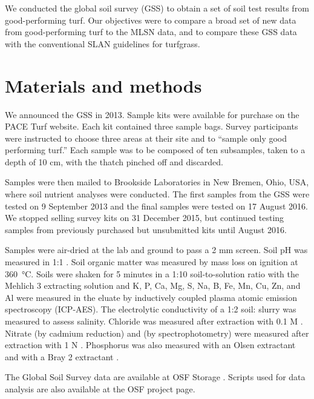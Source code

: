 \documentclass[12pt, a4paper, titlepage]{article}
\begin{document}
We conducted the global soil survey (GSS) to obtain a set of soil test results from good-performing turf. Our objectives were to compare a broad set of new data from good-performing turf to the MLSN data, and to compare these GSS data with the conventional SLAN guidelines for turfgrass.

\section*{Materials and methods}

We announced the GSS in 2013. Sample kits were available for purchase on the PACE Turf website. Each kit contained three sample bags. Survey participants were instructed to choose three areas at their site and to ``sample only good performing turf.'' Each sample was to be composed of ten subsamples, taken to a depth of 10 cm, with the thatch pinched off and discarded.

Samples were then mailed to Brookside Laboratories in New Bremen, Ohio, USA, where soil nutrient analyses were conducted. The first samples from the GSS were tested on 9 September 2013 and the final samples were tested on 17 August 2016. We stopped selling survey kits on 31 December 2015, but continued testing samples from previously purchased but unsubmitted kits until August 2016.

Samples were air-dried at the lab and ground to pass a 2 mm screen. Soil pH was measured in 1:1 . Soil organic matter was measured by mass loss on ignition at \SI{360}{\celsius}. Soils were shaken for 5 minutes in a 1:10 soil-to-solution ratio with the Mehlich 3 extracting solution \parencite{mehlich1984} and K, P, Ca, Mg, S, Na, B, Fe, Mn, Cu, Zn, and Al were measured in the eluate by inductively coupled plasma atomic emission spectroscopy (ICP-AES). The electrolytic conductivity of a 1:2 soil: slurry was measured to assess salinity. Chloride was measured after extraction with 0.1 M  \parencite[p.~126]{gavlak2005}. Nitrate (by cadmium reduction) and  (by spectrophotometry) were measured after extraction with 1 N . Phosphorus was also measured with an Olsen extractant and with a Bray 2 extractant \parencite{ncr2012}.

The Global Soil Survey data are available at OSF Storage \parencite{woods_gssdata2020}. Scripts used for data analysis are also available at the OSF project page.
\end{document}
